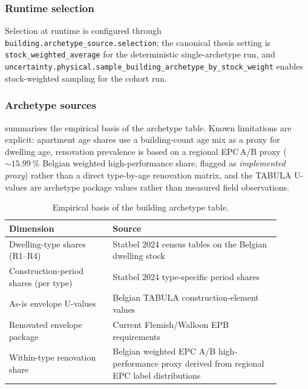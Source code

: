 \subsubsection*{Runtime selection}
Selection at runtime is configured through \texttt{building.archetype\_source.selection}; the canonical thesis setting is \texttt{stock\_weighted\_average} for the deterministic single-archetype run, and \texttt{uncertainty.physical.sample\_building\_archetype\_by\_stock\_weight} enables stock-weighted sampling for the cohort run.

\subsubsection*{Archetype sources}
 summarises the empirical basis of the archetype table. Known limitations are explicit: apartment age shares use a building-count age mix as a proxy for dwelling age, renovation prevalence is based on a regional EPC\,A/B proxy ($\sim\SI{15.99}{\percent}$ Belgian weighted high-performance share, flagged as \emph{implemented proxy}) rather than a direct type-by-age renovation matrix, and the TABULA U-values are archetype package values rather than measured field observations.
 
\begin{table}[ht]
  \centering
  \footnotesize
  \caption{Empirical basis of the building archetype table.}
  \label{tab:archetype_sources}
  \begin{tabular}{@{}p{0.34\linewidth} p{0.55\linewidth}@{}}
    \toprule
    \textbf{Dimension} & \textbf{Source} \\
    \midrule
    Dwelling-type shares (R1--R4)
      & Statbel 2024 census tables on the Belgian dwelling stock
        \cite{Statbel2024Census} \\
    Construction-period shares (per type)
      & Statbel 2024 type-specific period shares
        \cite{Statbel2024Census} \\
    As-is envelope U-values
      & Belgian TABULA construction-element values
        \cite{Loga2016TABULA,Cyx2011TABULABE} \\
    Renovated envelope package
      & Current Flemish/Walloon EPB requirements
        \cite{VEKAEnergyPerformance,SPWEnergyPerformance} \\
    Within-type renovation share
      & Belgian weighted EPC A/B high-performance proxy derived from
        regional EPC label distributions \cite{CLIMACT2024ResidentialRenovation,BISAMiniBru2025} \\
    \bottomrule
  \end{tabular}
\end{table}


